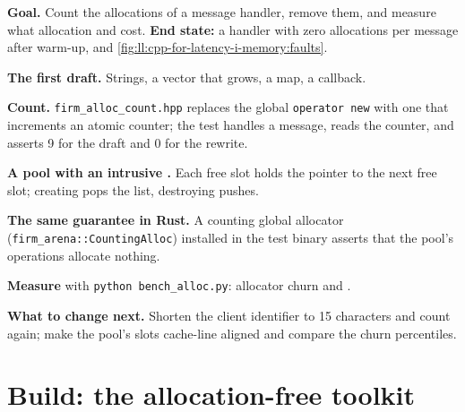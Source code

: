 \begin{tutorial}
\textbf{Goal.} Count the allocations of a message handler, remove them, and measure what allocation and  cost.
\textbf{End state:} a handler with zero allocations per message after warm-up, and
\cref{fig:ll:cpp-for-latency-i-memory:faults}.
\begin{tutsteps}
\item \textbf{The first draft.} Strings, a vector that grows, a map, a callback.
\label{lst:ll:cpp-for-latency-i-memory:naive}
\item \textbf{Count.} \texttt{firm\_alloc\_count.hpp} replaces the global \texttt{operator new} with one that increments an
atomic counter; the test handles a message, reads the counter, and asserts 9 for the draft and 0 for the rewrite.
\item \textbf{A pool with an intrusive .} Each free slot holds the pointer to the next free slot; creating pops
the list, destroying pushes.
\label{lst:ll:cpp-for-latency-i-memory:pool}
\item \textbf{The same guarantee in Rust.} A counting global allocator (\texttt{firm\_arena::CountingAlloc}) installed
in the test binary asserts that the pool's operations allocate nothing.
\item \textbf{Measure} with \texttt{python bench\_alloc.py}: allocator churn and .
\end{tutsteps}
\textbf{What to change next.} Shorten the client identifier to 15 characters and count again; make the pool's slots
cache-line aligned and compare the churn percentiles.
\end{tutorial}

\section{Build: the allocation-free toolkit}\label{bld:ll:cpp-for-latency-i-memory:arena}

